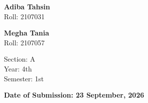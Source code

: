 \documentclass[10pt,a4paper]{article}
\begin{document}
\begin{titlepage}
\begin{minipage}[t]{0.32\textwidth}
\textbf{Adiba Tahsin}\\
Roll: 2107031

\vspace{0.35cm}
\textbf{Megha Tania}\\
Roll: 2107057

\vspace{0.4cm}
Section: A\\
Year: 4th\\
Semester: 1st
\end{minipage}

\vfill
{\large\bfseries Date of Submission: 23 September, 2026}
\vspace*{0.5cm}
\end{titlepage}
\restoregeometry
\end{document}
